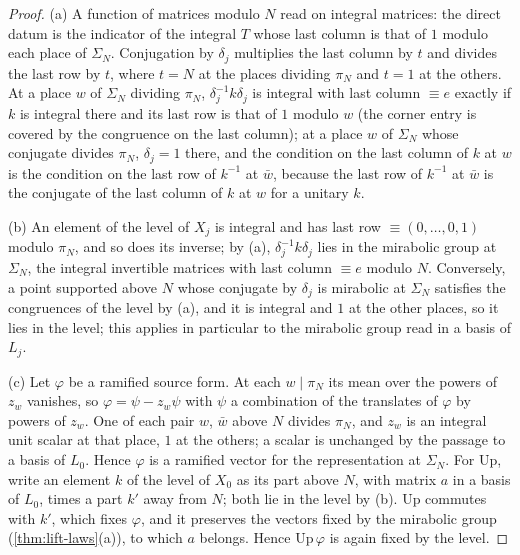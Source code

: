 \begin{proof}
(a) A function of matrices modulo $N$ read on integral matrices: the direct datum is the indicator of the integral $T$ whose last column is that of $1$ modulo each place of $\Sigma_N$. Conjugation by $\delta_j$ multiplies the last column by $t$ and divides the last row by $t$, where $t=N$ at the places dividing $\pi_N$ and $t=1$ at the others. At a place $w$ of
$\Sigma_N$ dividing $\pi_N$, $\delta_j^{-1}k\delta_j$ is integral with last column $\equiv e$ exactly if $k$ is integral there and its last row is that of $1$ modulo $w$ (the corner entry is covered by the congruence on the last column); at a place $w$ of $\Sigma_N$ whose conjugate divides $\pi_N$, $\delta_j=1$ there, and the condition on the last column of $k$ at $w$ is the
condition on the last row of $k^{-1}$ at $\bar w$, because the last row of $k^{-1}$ at $\bar w$ is the conjugate of the last column of $k$ at $w$ for a unitary $k$.

(b) An element of the level of $X_j$ is integral and has last row $\equiv(0,\dots,0,1)$ modulo $\pi_N$, and so does its inverse; by (a), $\delta_j^{-1}k\delta_j$ lies in the mirabolic group at $\Sigma_N$, the integral invertible matrices with last column $\equiv e$ modulo $N$. Conversely, a point supported above $N$ whose conjugate by $\delta_j$ is mirabolic at $\Sigma_N$
satisfies the congruences of the level by (a), and it is integral and $1$ at the other places, so it lies in the level; this applies in particular to the mirabolic group read in a basis of $L_j$.

(c) Let $\varphi$ be a ramified source form. At each $w\mid\pi_N$ its mean over the powers of $z_w$ vanishes, so $\varphi=\psi-z_w\psi$ with $\psi$ a combination of the translates of $\varphi$ by powers of $z_w$. One of each pair $w$, $\bar w$ above $N$ divides $\pi_N$, and $z_w$ is an integral unit scalar at that place, $1$ at the others; a scalar is unchanged by the
passage to a basis of $L_0$. Hence $\varphi$ is a ramified vector for the representation at $\Sigma_N$. For $\mathrm{Up}$, write an element $k$ of the level of $X_0$ as its part above $N$, with matrix $a$ in a basis of $L_0$, times a part $k'$ away from $N$; both lie in the level by (b). $\mathrm{Up}$ commutes with $k'$, which fixes $\varphi$, and it preserves the vectors fixed
by the mirabolic group (\cref{thm:lift-laws}(a)), to which $a$ belongs. Hence $\mathrm{Up}\,\varphi$ is again fixed by the level.
\end{proof}

